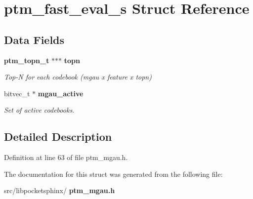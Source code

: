 \section{ptm\+\_\+fast\+\_\+eval\+\_\+s Struct Reference}
\label{structptm__fast__eval__s}
\subsection*{Data Fields}
\begin{DoxyCompactItemize}
\item 
\mbox{\label{structptm__fast__eval__s_a95e382028ed8a0af8b56bfcb797af96b}} 
\textbf{ ptm\+\_\+topn\+\_\+t} $\ast$$\ast$$\ast$ \textbf{ topn}
\begin{DoxyCompactList}\small\item\em Top-\/N for each codebook (mgau x feature x topn) \end{DoxyCompactList}\item 
\mbox{\label{structptm__fast__eval__s_ac5d3b21239d567b395015d7c4fea157c}} 
bitvec\+\_\+t $\ast$ \textbf{ mgau\+\_\+active}
\begin{DoxyCompactList}\small\item\em Set of active codebooks. \end{DoxyCompactList}\end{DoxyCompactItemize}


\subsection{Detailed Description}


Definition at line 63 of file ptm\+\_\+mgau.\+h.



The documentation for this struct was generated from the following file\+:\begin{DoxyCompactItemize}
\item 
src/libpocketsphinx/\textbf{ ptm\+\_\+mgau.\+h}\end{DoxyCompactItemize}
